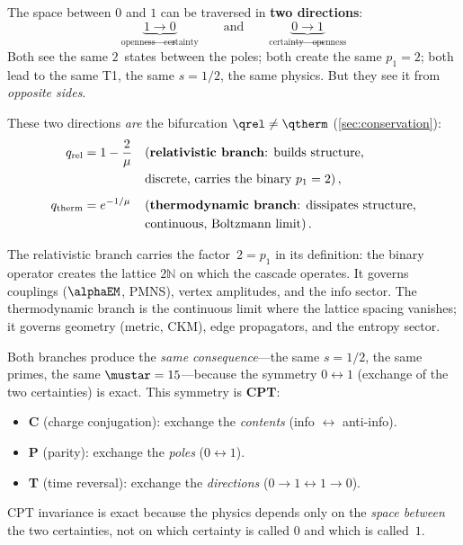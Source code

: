 \documentclass[12pt,a4paper]{article}
\begin{document}
\begin{remark}
\label{rem:two_directions}
The space between $0$ and $1$ can be traversed in
\textbf{two directions}:
\[
  \underbrace{1 \to 0}_{\text{openness} \to \text{certainty}}
  \qquad\text{and}\qquad
  \underbrace{0 \to 1}_{\text{certainty} \to \text{openness}}
\]
Both see the same $2$~states between the poles; both create the
same $p_1 = 2$; both lead to the same T1, the same $s = 1/2$,
the same physics.  But they see it from \emph{opposite sides}.

These two directions \emph{are} the bifurcation
$\qrel \neq \qtherm$ (\cref{sec:conservation}):
\begin{align}
  q_{\rm rel} &= 1 - \frac{2}{\mu}
  &&\text{(\textbf{relativistic branch}: builds structure,}
  \notag\\
  &&&\text{discrete, carries the binary $p_1 = 2$)}\,, \label{eq:q_rel} \\[4pt]
  q_{\rm therm} &= e^{-1/\mu}
  &&\text{(\textbf{thermodynamic branch}: dissipates structure,}
  \notag\\
  &&&\text{continuous, Boltzmann limit)}\,. \label{eq:q_therm}
\end{align}

The relativistic branch carries the factor~$2 = p_1$ in its
definition: the binary operator creates the lattice $2\mathbb{N}$
on which the cascade operates.  It governs couplings
($\alphaEM$, PMNS), vertex amplitudes, and the info sector.
The thermodynamic branch is the continuous limit where the
lattice spacing vanishes; it governs geometry (metric, CKM),
edge propagators, and the entropy sector.

Both branches produce the \emph{same consequence}---the same
$s = 1/2$, the same primes, the same $\mustar = 15$---because
the symmetry $0 \leftrightarrow 1$ (exchange of the two
certainties) is exact.  This symmetry is \textbf{CPT}:
\begin{itemize}[nosep]
\item \textbf{C} (charge conjugation): exchange the \emph{contents}
  (info $\leftrightarrow$ anti-info).
\item \textbf{P} (parity): exchange the \emph{poles}
  ($0 \leftrightarrow 1$).
\item \textbf{T} (time reversal): exchange the \emph{directions}
  ($0{\to}1 \leftrightarrow 1{\to}0$).
\end{itemize}
CPT invariance is exact because the physics depends only on the
\emph{space between} the two certainties, not on which certainty
is called $0$ and which is called~$1$.


\end{remark}
\end{document}
